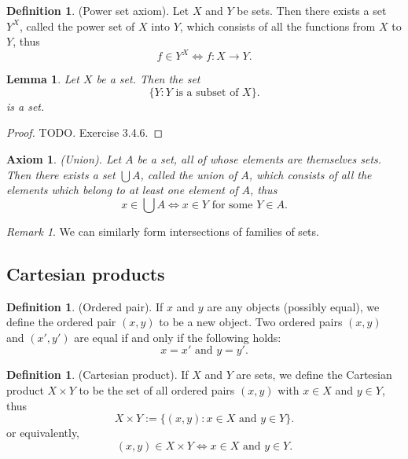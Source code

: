 \documentclass[12pt]{article}
\newtheorem{lemma}[theorem]{Lemma}
\newtheorem{axiom}[theorem]{Axiom}
\theoremstyle{definition}
\newtheorem{definition}[theorem]{Definition}
\theoremstyle{remark}
\newtheorem*{remark}{Remark}
\begin{document}
\begin{definition}
    (Power set axiom). Let $X$ and $Y$ be sets. Then there exists a set $Y^X$, called the power set of $X$ into $Y$, which consists of all the functions from $X$ to $Y$, thus \[
    f \in Y^X \iff f \colon X \to Y
    .\]  
\end{definition}

\begin{lemma}
    Let $X$ be a set. Then the set \[
    \{Y \colon Y \text{ is a subset of } X\}
    .\] is a set.
\end{lemma}

\begin{proof}
    TODO. Exercise 3.4.6.
\end{proof}

\begin{axiom}
    (Union). Let $A$ be a set, all of whose elements are themselves sets. Then there exists a set $\bigcup A$, called the union of $A$, which consists of all the elements which belong to at least one element of $A$, thus \[
    x \in \bigcup A \iff x \in Y \text{ for some } Y \in A
    .\]
\end{axiom}

\begin{remark}
    We can similarly form intersections of families of sets.
\end{remark}

\subsection{Cartesian products}

\begin{definition}
    (Ordered pair). If $x$ and $y$ are any objects (possibly equal), we define the ordered pair $(x, y)$ to be a new object. Two ordered pairs $(x, y)$ and $(x',y')$ are equal if and only if the following holds: \[
        x = x' \text{ and } y = y'
    .\]
\end{definition}

\begin{definition}
    (Cartesian product). If $X$ and $Y$ are sets, we define the Cartesian product $X \times Y$ to be the set of all ordered pairs $(x, y)$ with $x \in X$ and $y \in Y$, thus \[
        X \times Y := \{(x, y) \colon x \in X \text{ and } y \in Y\}
    .\]
    or equivalently, \[
        (x, y) \in X \times Y \iff x \in X \text{ and } y \in Y
    .\]
\end{definition}
\end{document}
